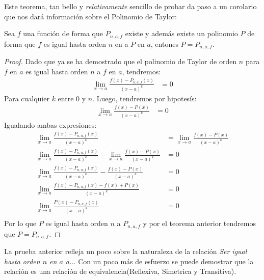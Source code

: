 \documentclass[12pt,a4paper,oneside]{memoir}
\begin{document}
Este teorema, tan bello y \textit{relativamente} sencillo de probar da paso a un corolario que nos dará información sobre el Polinomio de Taylor:
\begin{corollary}
    Sea $f$ una función de forma que $P_{n, a, f}$ existe y además existe un polinomio $P$ de forma que $f$ es igual hasta orden $n$ en a $P$ en $a$, entones $P = P_{n, a, f}$.
\end{corollary}
\begin{proof}
    Dado que ya se ha demostrado que el polinomio de Taylor de orden $n$ para $f$ en $a$ es igual hasta orden $n$ a $f$ en $a$, tendremos:
    \begin{align*}
        \lim_{x \to a} \frac{f(x) - P_{n, a, f}(x)}{(x-a)^k} &= 0
    \end{align*} 
    Para cualquier $k$ entre $0$ y $n$. Luego, tendremos por hipotesís:
    \begin{align*}
        \lim_{x \to a} \frac{f(x) - P(x)}{(x-a)^k} &= 0
    \end{align*}
    Igualando ambas expresiones:
    \begin{align*}
        \lim_{x \to a} \frac{f(x) - P_{n, a, f}(x)}{(x-a)^k} &= \lim_{x \to a} \frac{f(x) - P(x)}{(x-a)^k}\\
        \lim_{x \to a} \frac{f(x) - P_{n, a, f}(x)}{(x-a)^k} - \lim_{x \to a} \frac{f(x) - P(x)}{(x-a)^k} &= 0\\
        \lim_{x \to a} \frac{f(x) - P_{n, a, f}(x)}{(x-a)^k} - \frac{f(x) - P(x)}{(x-a)^k} &= 0\\
        \lim_{x \to a} \frac{f(x) - P_{n, a, f}(x) - f(x) + P(x)}{(x-a)^k} &= 0\\
        \lim_{x \to a} \frac{P(x) - P_{n, a, f}(x)}{(x-a)^k} &= 0\\
    \end{align*}
    Por lo que $P$ es igual hasta orden $n$ a $P_{n, a, f}$ y por el teorema anterior tendremos que $P = P_{n, a, f}$.
\end{proof}

\begin{remark}
    La prueba anterior refleja un poco sobre la naturaleza de la relación \textit{Ser igual hasta orden $n$ en $a$ a..}. Con un poco más de esfuerzo se puede demostrar que la relación es una relación de equivalencia(Reflexiva, Simetrica y Transitiva).
\end{remark}
\end{document}
